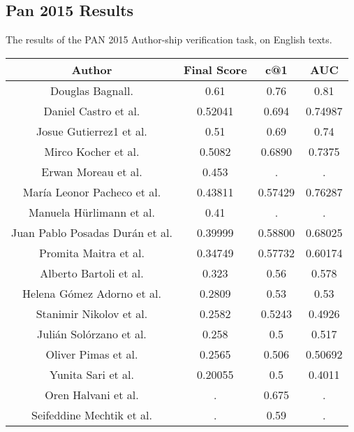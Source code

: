 \subsection{Pan 2015 Results} \label{subsec:pan2015res}
The results of the PAN 2015 Author-ship verification task, on English texts.

\begin{center}
\begin{tabular}{|c|c|c|c|}
\hline
\textbf{Author}          & \textbf{Final Score} & \textbf{c@1} & \textbf{AUC} \\ \hline
Douglas Bagnall. & 0.61 & 0.76 & 0.81 \\ \hline
Daniel Castro et al. & 0.52041 & 0.694 & 0.74987\\ \hline
Josue Gutierrez1 et al. & 0.51 & 0.69 & 0.74 \\ \hline
Mirco Kocher et al. & 0.5082 & 0.6890 & 0.7375 \\ \hline
Erwan Moreau et al. & 0.453 & . & . \\ \hline
María Leonor Pacheco et al. & 0.43811 & 0.57429 & 0.76287 \\ \hline
Manuela Hürlimann et al. & 0.41 & . & . \\ \hline
Juan Pablo Posadas Durán et al. & 0.39999 & 0.58800 & 0.68025 \\ \hline
Promita Maitra et al. & 0.34749  & 0.57732 & 0.60174 \\ \hline
Alberto Bartoli et al. & 0.323 & 0.56 & 0.578 \\ \hline
Helena Gómez Adorno et al. & 0.2809 & 0.53 & 0.53 \\ \hline
Stanimir Nikolov et al. & 0.2582 & 0.5243 & 0.4926 \\ \hline
Julián Solórzano et al. & 0.258 & 0.5 & 0.517 \\ \hline
Oliver Pimas et al. & 0.2565  & 0.506 & 0.50692 \\ \hline
Yunita Sari et al. & 0.20055 & 0.5 & 0.4011 \\ \hline
Oren Halvani et al. & . & 0.675 & . \\ \hline
Seifeddine Mechtik et al. & .  & 0.59 & . \\ \hline
\end{tabular}
\end{center}



